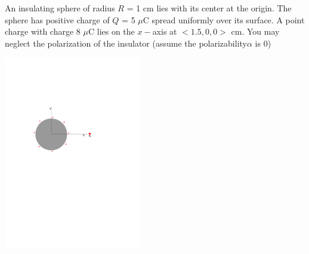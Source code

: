 \newcommand{\radius}{1 cm}
\newcommand{\qpt}{8 $\mu$C}
\newcommand{\Q}{5 $\mu$C}
\newcommand{\qloc}{$<1.5,0,0>$ cm}
\newcommand{\rone}{$<0,0.5,0>$ cm}
\newcommand{\rtwo}{$<0,5,0>$ cm}
\question An insulating sphere of radius $R$ = \radius{} lies with its center at the origin. The sphere has positive charge of $Q$ = \Q{} spread uniformly over its surface. A point charge with charge \qpt{} lies on the $x-$axis at \qloc. You may neglect the polarization of the insulator (assume the polarizability$\alpha$ is 0)

\begin{center}
	\includegraphics[width=6cm]{charge_and_sphere.pdf}
\end{center}

